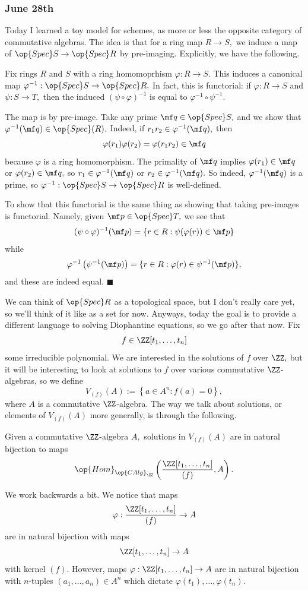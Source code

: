 \subsubsection{June 28th}
Today I learned a toy model for schemes, as more or less the opposite category of commutative algebras. The idea is that for a ring map $R\to S,$ we induce a map of $\op{Spec}S\to\op{Spec}R$ by pre-imaging. Explicitly, we have the following.
\begin{proposition}
    Fix rings $R$ and $S$ with a ring homomoprhism $\varphi:R\to S.$ This induces a canonical map $\varphi^{-1}:\op{Spec}S\to\op{Spec}R.$ In fact, this is functorial: if $\varphi:R\to S$ and $\psi:S\to T,$ then the induced $(\psi\circ\varphi)^{-1}$ is equal to $\varphi^{-1}\circ\psi^{-1}.$
\end{proposition}
The map is by pre-image. Take any prime $\mf q\in\op{Spec}S,$ and we show that $\varphi^{-1}(\mf q)\in\op{Spec}(R).$ Indeed, if $r_1r_2\in\varphi^{-1}(\mf q),$ then
\[\varphi(r_1)\varphi(r_2)=\varphi(r_1r_2)\in\mf q\]
because $\varphi$ is a ring homomorphism. The primality of $\mf q$ implies $\varphi(r_1)\in\mf q$ or $\varphi(r_2)\in\mf q,$ so $r_1\in\varphi^{-1}(\mf q)$ or $r_2\in\varphi^{-1}(\mf q).$ So indeed, $\varphi^{-1}(\mf q)$ is a prime, so $\varphi^{-1}:\op{Spec}S\to\op{Spec}R$ is well-defined.

To show that this functorial is the same thing as showing that taking pre-images is functorial. Namely, given $\mf p\in\op{Spec}T,$ we see that
\[(\psi\circ\varphi)^{-1}(\mf p)=\{r\in R:\psi(\varphi(r))\in\mf p\}\]
while
\[\varphi^{-1}\left(\psi^{-1}(\mf p)\right)=\{r\in R:\varphi(r)\in\psi^{-1}(\mf p)\},\]
and these are indeed equal. $\blacksquare$

We can think of $\op{Spec}R$ as a topological space, but I don't really care yet, so we'll think of it like as a set for now. Anyways, today the goal is to provide a different language to solving Diophantine equations, so we go after that now. Fix
\[f\in\ZZ[t_1,\ldots,t_n]\]
some irreducible polynomial. We are interested in the solutions of $f$ over $\ZZ,$ but it will be interesting to look at solutions to $f$ over various commutative $\ZZ$-algebras, so we define
\[V_{(f)}(A):=\left\{a\in A^n:f(a)=0\right\},\]
where $A$ is a commutative $\ZZ$-algebra. The way we talk about solutions, or elements of $V_{(f)}(A)$ more generally, is through the following.
\begin{lemma}
    Given a commutative $\ZZ$-algebra $A,$ solutions in $V_{(f)}(A)$ are in natural bijection to maps
    \[\op{Hom}_{\op{CAlg}_\ZZ}\left(\frac{\ZZ[t_1,\ldots,t_n]}{(f)},A\right).\]
\end{lemma}
We work backwards a bit. We notice that maps
\[\varphi:\frac{\ZZ[t_1,\ldots,t_n]}{(f)}\to A\]
are in natural bijection with maps
\[\ZZ[t_1,\ldots,t_n]\to A\]
with kernel $(f).$ However, maps $\varphi:\ZZ[t_1,\ldots,t_n]\to A$ are in natural bijection with $n$-tuples $(a_1,\ldots,a_n)\in A^n$ which dictate $\varphi(t_1),\ldots,\varphi(t_n).$

